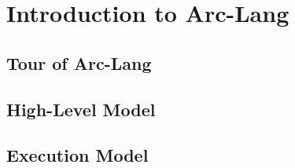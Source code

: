 

\section{Introduction to Arc-Lang}


\subsection{Tour of Arc-Lang}


\subsection{High-Level Model}


\subsection{Execution Model}

